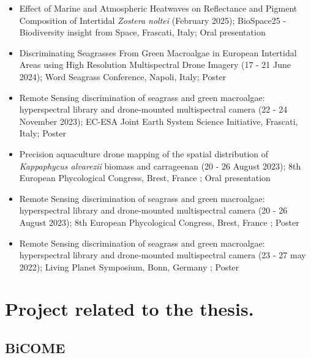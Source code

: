 \documentclass[
  letterpaper,
  11pt,
  english,
  singlespacing,
  headsepline]{MastersDoctoralThesis}
\begin{document}
\begin{itemize}
\item
  Effect of Marine and Atmospheric Heatwaves on Reflectance and Pigment
  Composition of Intertidal \emph{Zostera noltei} (February 2025);
  BioSpace25 - Biodiversity insight from Space, Frascati, Italy; Oral
  presentation
\item
  Discriminating Seagrasses From Green Macroalgae in European Intertidal
  Areas using High Resolution Multispectral Drone Imagery (17 - 21 June
  2024); Word Seagrass Conference, Napoli, Italy; Poster
\item
  Remote Sensing discrimination of seagrass and green macroalgae:
  hyperspectral library and drone-mounted multispectral camera (22 - 24
  November 2023); EC-ESA Joint Earth System Science Initiative,
  Frascati, Italy; Poster
\item
  Precision aquaculture drone mapping of the spatial distribution of
  \emph{Kappaphycus alvarezii} biomass and carrageenan (20 - 26 August
  2023); 8th European Phycological Congress, Brest, France ; Oral
  presentation
\item
  Remote Sensing discrimination of seagrass and green macroalgae:
  hyperspectral library and drone-mounted multispectral camera (20 - 26
  August 2023); 8th European Phycological Congress, Brest, France ;
  Poster
\item
  Remote Sensing discrimination of seagrass and green macroalgae:
  hyperspectral library and drone-mounted multispectral camera (23 - 27
  may 2022); Living Planet Symposium, Bonn, Germany ; Poster
\end{itemize}

\section*{Project related to the
thesis.}\label{project-related-to-the-thesis.}


\subsection*{BiCOME}\label{bicome}
\end{document}
